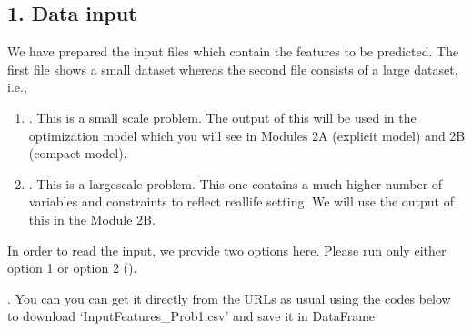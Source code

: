 \documentclass[letterpaper,10pt,english]{jupyterBook}
\begin{document}
\subsection{1. Data input}
\label{\detokenize{docs/Case1_3_Module1B_Retail_Demand_Predict:data-input}}
\sphinxAtStartPar
We have prepared the input files which contain the features to be predicted. The first file shows a small dataset whereas the second file consists of a large dataset, i.e.,
\begin{enumerate}
%
\item {} 
\sphinxAtStartPar
{}. This is a small scale problem. The output of this will be used in the optimization model which you will see in Modules 2A (explicit model) and 2B (compact model).

\item {} 
\sphinxAtStartPar
{}. This is a large\sphinxhyphen{}scale problem. This one contains a much higher number of variables and constraints to reflect real\sphinxhyphen{}life setting. We will use the output of this in the Module 2B.

\end{enumerate}

\sphinxAtStartPar
In order to read the input, we provide two options here. Please run only either option 1 or option 2 ().

\sphinxAtStartPar
{}. You can you can get it directly from the URLs as usual using the codes below to download ‘InputFeatures\_Prob1.csv’ and save it in DataFrame
\end{document}
